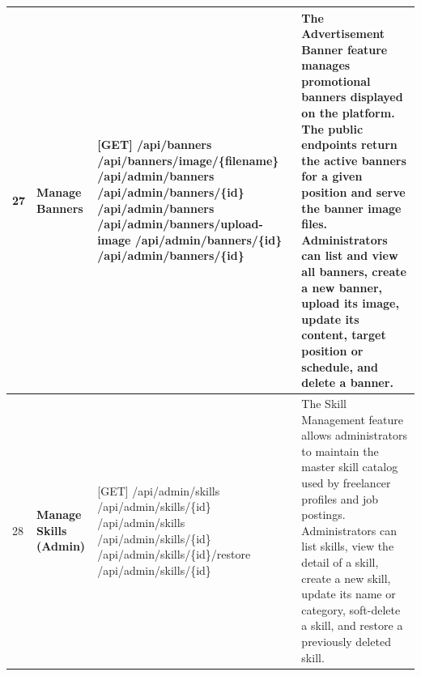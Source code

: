 \begin{longtable}{|C{0.7cm}|L{2.6cm}|S{6.6cm}|L{5.2cm}|}
27
&
\textbf{Manage Banners}
&
[GET] /\allowbreak{}api/\allowbreak{}banners \newline
[GET] /\allowbreak{}api/\allowbreak{}banners/\allowbreak{}image/\allowbreak{}\{filename\} \newline
[GET] /\allowbreak{}api/\allowbreak{}admin/\allowbreak{}banners \newline
[GET] /\allowbreak{}api/\allowbreak{}admin/\allowbreak{}banners/\allowbreak{}\{id\} \newline
[POST] /\allowbreak{}api/\allowbreak{}admin/\allowbreak{}banners \newline
[POST] /\allowbreak{}api/\allowbreak{}admin/\allowbreak{}banners/\allowbreak{}upload-image \newline
[PATCH] /\allowbreak{}api/\allowbreak{}admin/\allowbreak{}banners/\allowbreak{}\{id\} \newline
[DELETE] /\allowbreak{}api/\allowbreak{}admin/\allowbreak{}banners/\allowbreak{}\{id\}
&
The Advertisement Banner feature manages promotional banners displayed on the platform. The public endpoints return the active banners for a given position and serve the banner image files. Administrators can list and view all banners, create a new banner, upload its image, update its content, target position or schedule, and delete a banner.
\\ \hline

28
&
\textbf{Manage Skills (Admin)}
&
[GET] /\allowbreak{}api/\allowbreak{}admin/\allowbreak{}skills \newline
[GET] /\allowbreak{}api/\allowbreak{}admin/\allowbreak{}skills/\allowbreak{}\{id\} \newline
[POST] /\allowbreak{}api/\allowbreak{}admin/\allowbreak{}skills \newline
[PATCH] /\allowbreak{}api/\allowbreak{}admin/\allowbreak{}skills/\allowbreak{}\{id\} \newline
[PATCH] /\allowbreak{}api/\allowbreak{}admin/\allowbreak{}skills/\allowbreak{}\{id\}/\allowbreak{}restore \newline
[DELETE] /\allowbreak{}api/\allowbreak{}admin/\allowbreak{}skills/\allowbreak{}\{id\}
&
The Skill Management feature allows administrators to maintain the master skill catalog used by freelancer profiles and job postings. Administrators can list skills, view the detail of a skill, create a new skill, update its name or category, soft-delete a skill, and restore a previously deleted skill.
\\ \hline

\end{longtable}
\endgroup

